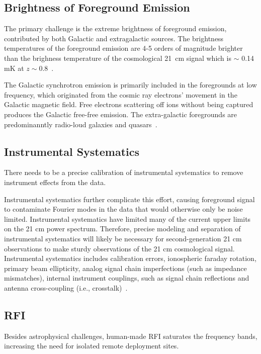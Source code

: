 \documentclass[12pt,a4paper]{report}
\begin{document}
	\subsection*{Brightness of Foreground Emission}
	
	The	primary challenge is the extreme brightness of foreground emission, contributed by both Galactic and extragalactic sources.
	The brightness temperatures of the foreground emission are 4-5 orders of magnitude brighter than the brighness temperature of the cosmological \SI{21}{cm} signal which is $\sim$ 0.14 mK at $z\sim0.8$~\citep{2018RAA....18..114H}.
	
	The Galactic synchrotron emission is primarily included in the foregrounds at low frequency, which originated from the cosmic ray electrons' movement in the Galactic magnetic field. Free electrons scattering off ions without being captured produces the Galactic free-free emission. The extra-galactic foregrounds are predominanntly radio-loud galaxies and quasars~\citep{2018RAA....18..114H, 2008MNRAS.389.1319J}.

	\subsection*{Instrumental Systematics}
	
	There needs to be a precise calibration of instrumental systematics to remove instrument effects from the data.
		
	Instrumental systematics further complicate this effort, causing foreground signal to contaminate Fourier modes in the data that would otherwise only be noise limited. Instrumental systematics have limited many of the current upper limits on the 21 cm power spectrum. Therefore, precise modeling and separation of instrumental systematics will likely be necessary for second-generation 21 cm observations to make sturdy observations of the 21 cm cosmological signal. Instrumental systematics includes calibration errors, ionospheric faraday rotation, primary beam ellipticity, analog signal chain imperfections (such as impedance mismatches), internal instrument couplings, such as signal chain reflections and antenna cross-coupling (i.e., crosstalk)~\citep{2020ApJ...888...70K}.
	
	
	
	\subsection*{RFI}
	
	Besides astrophysical challenges, human-made RFI saturates the frequency bands, increasing the need for isolated remote deployment sites. 
	
\end{document}

